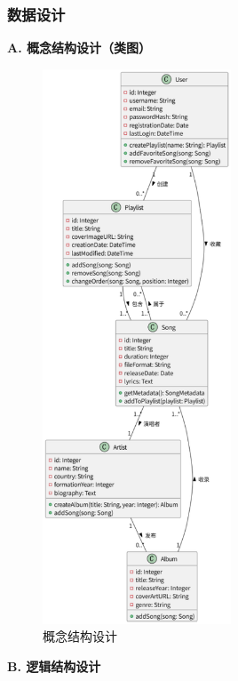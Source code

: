 \documentclass{base}
\numberwithin{figure}{section} %
\begin{document}
\subsubsection{数据设计}

\textbf{A. 概念结构设计（类图）}

\begin{figure}[H]
    \centering
    \includegraphics[width=0.5\textwidth]{images/5-14.png}
    \caption{概念结构设计}
\end{figure}

\textbf{B. 逻辑结构设计}
\end{document}
